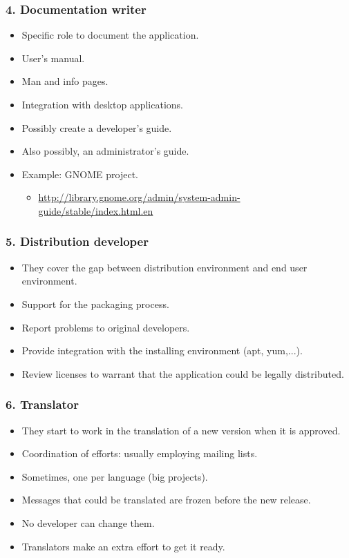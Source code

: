 \documentclass{beamer}
\begin{document}

\begin{frame}
 \frametitle{4. Documentation writer}
 \begin{itemize}
  \item Specific role to document the application.
  \item User's manual.
  \item Man and info pages.
  \item Integration with desktop applications.
  \item Possibly create a developer's guide.
  \item Also possibly, an administrator's guide.
  \item Example: GNOME project.
  \begin{itemize}
   \item \url{http://library.gnome.org/admin/system-admin-guide/stable/index.html.en}
  \end{itemize}

 \end{itemize}

\end{frame}


\begin{frame}
 \frametitle{5. Distribution developer}
 \begin{itemize}
  \item They cover the gap between distribution environment and end user environment.
  \item Support for the packaging process.
  \item Report problems to original developers.
  \item Provide integration with the installing environment (apt, yum,...).
  \item Review licenses to warrant that the application could be legally distributed.
 \end{itemize}

\end{frame}


\begin{frame}
 \frametitle{6. Translator}
 \begin{itemize}
  \item They start to work in the translation of a new version when it is approved.
  \item Coordination of efforts: usually employing mailing lists.
  \item Sometimes, one per language (big projects).
  \item Messages that could be translated are frozen before the new release.
  \item No developer can change them.
  \item Translators make an extra effort to get it ready.
 \end{itemize}

\end{frame}
\end{document}
